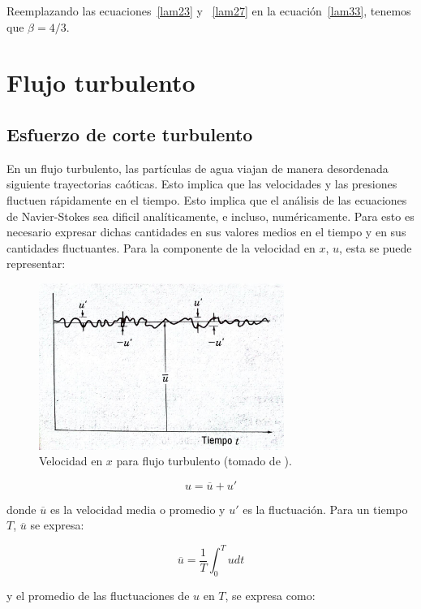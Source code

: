 \documentclass[11pt, oneside]{article}
\begin{document}
Reemplazando las ecuaciones~\ref{lam23} y ~\ref{lam27} en la ecuaci\'on~\ref{lam33}, tenemos que $\beta = 4/3$.

\section{Flujo turbulento}
\subsection{Esfuerzo de corte turbulento} %
En un flujo turbulento, las part\'iculas de agua viajan de manera desordenada siguiente trayectorias ca\'oticas. Esto implica que las velocidades y las presiones fluctuen r\'apidamente en el tiempo. Esto implica que el an\'alisis de las ecuaciones de Navier-Stokes sea dificil anal\'iticamente, e incluso, num\'ericamente. Para esto es necesario expresar dichas cantidades en sus valores medios en el tiempo y en sus cantidades fluctuantes. Para la componente de la velocidad en $x$, $u$, esta se puede representar:

\begin{figure}[h]
\centering
\includegraphics[width=8cm]{turb.jpeg}
\caption{Velocidad en $x$ para flujo turbulento (tomado de \cite{streeter}).}
\label{turb}
\end{figure}


\begin{equation}
u = \overline{u} + u'
\label{tur1}
\end{equation}

donde $\overline{u}$ es la velocidad media o promedio y $u'$ es la fluctuaci\'on. Para un tiempo $T$, $\overline{u}$ se expresa:

\begin{equation}
\overline{u} = \frac{1}{T} \int_0^T u dt
\label{tur2}
\end{equation}

y el promedio de las fluctuaciones de $u$ en $T$, se expresa como:
\end{document}
